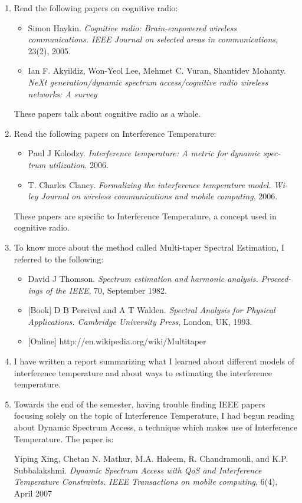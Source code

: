 \documentclass[10pt]{article}
\begin{document}
\begin{enumerate}
    \item Read the following papers on cognitive radio:

\begin{itemize}
    \item Simon Haykin. \emph{Cognitive radio: Brain-empowered wireless communications. IEEE Journal on selected areas in communications}, 23(2), 2005.
    \item Ian F. Akyildiz, Won-Yeol Lee, Mehmet C. Vuran, Shantidev Mohanty. \emph{NeXt generation/dynamic spectrum access/cognitive
radio wireless networks: A survey}
\end{itemize}

These papers talk about cognitive radio as a whole.



\item Read the following papers on Interference Temperature:

\begin{itemize}
    \item Paul J Kolodzy. \emph{Interference temperature: A metric for dynamic spec-
trum utilization}. 2006.
    \item T. Charles Clancy. \emph{Formalizing the interference temperature model. Wi-
ley Journal on wireless communications and mobile computing}, 2006.
\end{itemize}

These papers are specific to Interference Temperature, a concept used in cognitive radio.

\item To know more about the method called Multi-taper Spectral Estimation, I referred to the following:

\begin{itemize}
    \item David J Thomson. \emph{Spectrum estimation and harmonic analysis. Proceed-
ings of the IEEE}, 70, September 1982.
    \item{} [Book] D B Percival and A T Walden. \emph{Spectral Analysis for Physical Applications. Cambridge University Press}, London, UK, 1993.
    \item{} [Online] http://en.wikipedia.org/wiki/Multitaper
\end{itemize}


\item I have written a report summarizing what I learned about different models of interference temperature and about ways to estimating the interference temperature.


\item Towards the end of the semester, having trouble finding IEEE papers focusing solely on the topic of Interference Temperature,  I had begun reading about Dynamic Spectrum Access, a technique which makes use of Interference Temperature. The paper is:

Yiping Xing, Chetan N. Mathur, M.A. Haleem, R. Chandramouli, and K.P. Subbalakshmi. \emph{Dynamic Spectrum Access with QoS and Interference Temperature Constraints. IEEE Transactions on mobile computing}, 6(4), April 2007
\end{enumerate}
\end{document}
